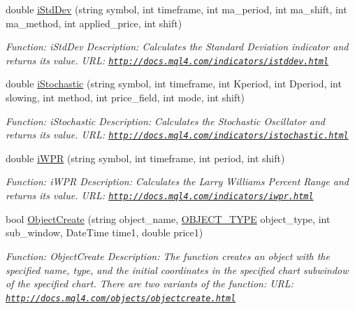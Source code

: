 \begin{DoxyCompactItemize}
double \hyperlink{class_m_q_l4_c_sharp_1_1_base_1_1_m_q_l_base_a66c509cbb139df35f24e84a5825b6724}{i\+Std\+Dev} (string symbol, int timeframe, int ma\+\_\+period, int ma\+\_\+shift, int ma\+\_\+method, int applied\+\_\+price, int shift)
\begin{DoxyCompactList}\small\item\em Function\+: i\+Std\+Dev Description\+: Calculates the Standard Deviation indicator and returns its value. U\+RL\+: \href{http://docs.mql4.com/indicators/istddev.html}{\tt http\+://docs.\+mql4.\+com/indicators/istddev.\+html} \end{DoxyCompactList}\item 
double \hyperlink{class_m_q_l4_c_sharp_1_1_base_1_1_m_q_l_base_a77d27c6a34ef96f14eeaddbe16c4cf06}{i\+Stochastic} (string symbol, int timeframe, int Kperiod, int Dperiod, int slowing, int method, int price\+\_\+field, int mode, int shift)
\begin{DoxyCompactList}\small\item\em Function\+: i\+Stochastic Description\+: Calculates the Stochastic Oscillator and returns its value. U\+RL\+: \href{http://docs.mql4.com/indicators/istochastic.html}{\tt http\+://docs.\+mql4.\+com/indicators/istochastic.\+html} \end{DoxyCompactList}\item 
double \hyperlink{class_m_q_l4_c_sharp_1_1_base_1_1_m_q_l_base_a06406fc4678b02da403105e92dd43fae}{i\+W\+PR} (string symbol, int timeframe, int period, int shift)
\begin{DoxyCompactList}\small\item\em Function\+: i\+W\+PR Description\+: Calculates the Larry Williams\textquotesingle{} Percent Range and returns its value. U\+RL\+: \href{http://docs.mql4.com/indicators/iwpr.html}{\tt http\+://docs.\+mql4.\+com/indicators/iwpr.\+html} \end{DoxyCompactList}\item 
bool \hyperlink{class_m_q_l4_c_sharp_1_1_base_1_1_m_q_l_base_a7bf049986619948c8107a7a2d801b021}{Object\+Create} (string object\+\_\+name, \hyperlink{namespace_m_q_l4_c_sharp_1_1_base_1_1_enums_a357639d93cdcbbcabdac179ac6242dd7}{O\+B\+J\+E\+C\+T\+\_\+\+T\+Y\+PE} object\+\_\+type, int sub\+\_\+window, Date\+Time time1, double price1)
\begin{DoxyCompactList}\small\item\em Function\+: Object\+Create Description\+: The function creates an object with the specified name, type, and the initial coordinates in the specified chart subwindow of the specified chart. There are two variants of the function\+: U\+RL\+: \href{http://docs.mql4.com/objects/objectcreate.html}{\tt http\+://docs.\+mql4.\+com/objects/objectcreate.\+html} \end{DoxyCompactList}\item 

\end{DoxyCompactItemize}
